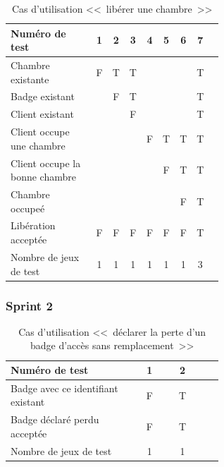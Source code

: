 \documentclass[11pt,article]{article}
\begin{document}
        \begin{table}[htbp!]
            \begin{tabular}{|p{0.6\linewidth}|c|c|c|c|c|c|c|c|}
                \hline
                Numéro de test
                    &1&2&3&4&5&6&7\\
                \hline
                \hline

                Chambre existante
                    &F&T&T& & & &T\\
                \hline
                Badge existant
                    & &F&T& & & &T\\
                \hline
                Client existant
                    & & &F& & & &T\\
                \hline
				\hline
                Client occupe une chambre
                    & & & &F&T&T&T\\
                \hline
                Client occupe la bonne chambre
                    & & & & &F&T&T\\
				\hline
				\hline
				Chambre occupeé
					& & & & & &F&T\\
                \hline
                \hline                Libération acceptée
                    &F&F&F&F&F&F&T\\
                \hline
                \hline
                Nombre de jeux de test
                    &1&1&1&1&1&1&3 \\
                \hline
            \end{tabular}
            \caption{Cas d'utilisation <<~libérer une chambre~>>}
        \end{table}

		\newpage

		        \subsubsection{Sprint 2}

		            \begin{table}[htbp!]
		                \begin{tabular}{|p{0.6\linewidth}|c|c|c|}
		                    \hline
		                    Numéro de test
		                        &1&2\\
		                    \hline
		                    \hline
		                   Badge avec ce identifiant existant
		                        &F&T\\
		                    \hline
		                    \hline
		                    Badge déclaré perdu acceptée
		                        &F&T\\
		                    \hline
		                    \hline
		                    Nombre de jeux de test
		                        &1&1\\
		                    \hline
		                \end{tabular}
		                \caption{Cas d'utilisation <<~déclarer la perte d'un badge d'accès sans remplacement~>>}
		            \end{table}
\newpage
\end{document}
